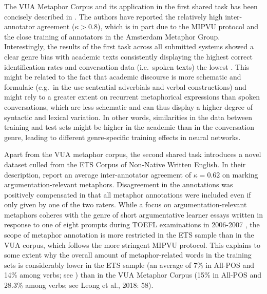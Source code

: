 \documentclass[11pt,a4paper]{article}
\begin{document}
The VUA Metaphor Corpus and its application in the first shared task has been concisely described in \citet{leong-EtAl:2018:PFLP}. The authors have reported the relatively high inter-annotator agreement ($\kappa>0.8$), which is in part due to the MIPVU protocol \citep{Steen2010} and the close training of annotators in the Amsterdam Metaphor Group. Interestingly, the results of the first task across all submitted systems showed a clear genre bias with academic texts consistently displaying the highest correct identification rates and conversation data (i.e.~spoken texts) the lowest \citet[p.60]{leong-EtAl:2018:PFLP}. This might be related to the fact that academic discourse is more schematic and formulaic (e.g.~in the use sentential adverbials and verbal constructions) and might rely to a greater extent on recurrent metaphorical expressions than spoken conversations, which are less schematic and can thus display a higher degree of syntactic and lexical variation. In other words, similarities in the data between training and test sets might be higher in the academic than in the conversation genre, leading to different genre-specific training effects in neural networks.  

Apart from the VUA metaphor corpus, the second shared task introduces a novel dataset culled from the ETS Corpus of Non-Native Written English. In their description, \citet{beigmanklebanov-EtAl:2018} report an average inter-annotator agreement of $\kappa=0.62$ on marking argumentation-relevant metaphors. Disagreement in the annotations was positively compensated in that all metaphor annotations were included even if only given by one of the two raters. While a focus on argumentation-relevant metaphors coheres with the genre of short argumentative learner essays written in response to one of eight prompts during TOEFL examinations in 2006-2007 \citep{ETS2:ETS202331}, the scope of metaphor annotation is more restricted in the ETS sample than in the VUA corpus, which follows the more stringent MIPVU protocol. This explains to some extent why the overall amount of metaphor-related words in the training sets is considerably lower in the ETS sample (an average of 7\% in All-POS and 14\% among verbs; see \citealp[p.88]{beigmanklebanov-EtAl:2018}) than in the VUA Metaphor Corpus (15\% in All-POS and 28.3\% among verbs; see Leong et al., 2018: 58). 
\end{document}
